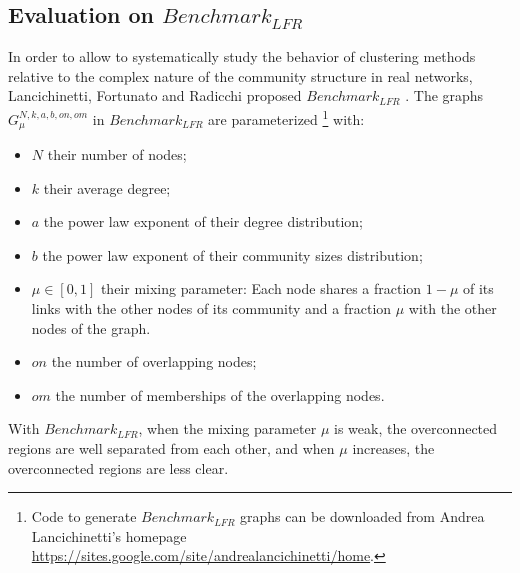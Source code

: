 \documentclass[12pt]{article}
\theoremstyle{thmstyleone}%
\theoremstyle{definition}
\begin{document}
\subsection{Evaluation on $Benchmark_{LFR}$\label{SubSubSecEvalLFR}}
In order to allow to systematically study the behavior of clustering methods relative to the complex nature of the community structure in real networks,
Lancichinetti, Fortunato and Radicchi proposed $Benchmark_{LFR}$ \cite{Lancichinetti2008Benchmark}.
The graphs $G^{N,k,a,b,on,om}_{\mu}$ in $Benchmark_{LFR}$ are parameterized \footnote{Code to generate $Benchmark_{LFR}$ graphs can be downloaded from Andrea Lancichinetti's homepage \url{https://sites.google.com/site/andrealancichinetti/home}.} with:
\begin{itemize}
 \item $N$ their number of nodes;
 \item $k$ their average degree;
 \item $a$ the power law exponent of their degree distribution;
 \item $b$ the power law exponent  of their community sizes distribution;
 \item $\mu \in [0,1]$ their mixing parameter: Each node shares a fraction $1 - \mu$ of its links with
the other nodes of its community and a fraction $\mu$
with the other nodes of the graph.
 \item $on$ the number of overlapping nodes;
 \item $om$ the number of memberships of the overlapping nodes.
\end{itemize}
%
With $Benchmark_{LFR}$, when the mixing parameter $\mu$ is weak, the overconnected regions are well separated from each other,
and when $\mu$ increases, the overconnected regions are less clear.
\end{document}
